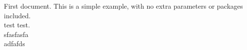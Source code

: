 \documentclass{article}
\begin{document}
First document. This is a simple example, with no extra parameters or packages included.\\
test test.\\
sfasfasfa\\
adfafds\\
\end{document}
